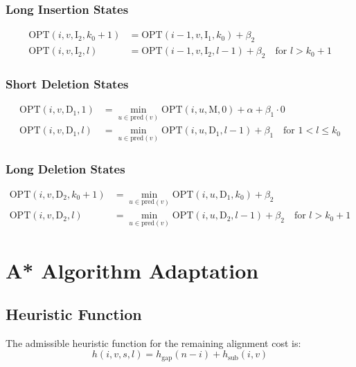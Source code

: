\documentclass[11pt]{article}
\begin{document}
\subsubsection{Long Insertion States}
\begin{align}
\text{OPT}(i, v, \text{I}_2, k_0+1) &= \text{OPT}(i-1, v, \text{I}_1, k_0) + \beta_2 \\
\text{OPT}(i, v, \text{I}_2, l) &= \text{OPT}(i-1, v, \text{I}_2, l-1) + \beta_2 \quad \text{for } l > k_0+1
\end{align}

\subsubsection{Short Deletion States}
\begin{align}
\text{OPT}(i, v, \text{D}_1, 1) &= \min_{u \in \text{pred}(v)} \text{OPT}(i, u, \text{M}, 0) + \alpha + \beta_1 \cdot 0 \\
\text{OPT}(i, v, \text{D}_1, l) &= \min_{u \in \text{pred}(v)} \text{OPT}(i, u, \text{D}_1, l-1) + \beta_1 \quad \text{for } 1 < l \leq k_0
\end{align}

\subsubsection{Long Deletion States}
\begin{align}
\text{OPT}(i, v, \text{D}_2, k_0+1) &= \min_{u \in \text{pred}(v)} \text{OPT}(i, u, \text{D}_1, k_0) + \beta_2 \\
\text{OPT}(i, v, \text{D}_2, l) &= \min_{u \in \text{pred}(v)} \text{OPT}(i, u, \text{D}_2, l-1) + \beta_2 \quad \text{for } l > k_0+1
\end{align}

\section{A* Algorithm Adaptation}

\subsection{Heuristic Function}

The admissible heuristic function for the remaining alignment cost is:
\begin{equation}
h(i, v, s, l) = h_{\text{gap}}(n-i) + h_{\text{sub}}(i, v)
\end{equation}
\end{document}
